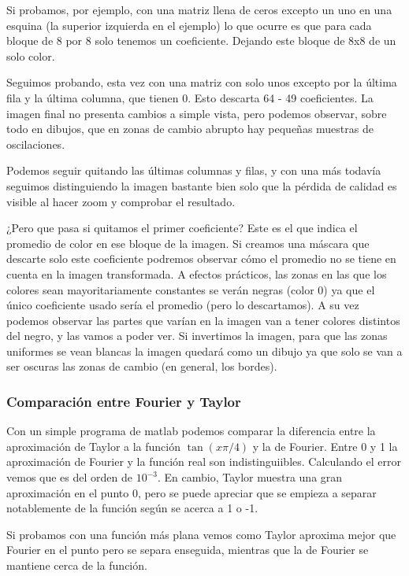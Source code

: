 		Si probamos, por ejemplo, con una matriz llena de ceros excepto un uno en una esquina (la superior izquierda en el ejemplo) lo que ocurre es que para cada bloque de 8 por 8 solo tenemos un coeficiente. Dejando este bloque de 8x8 de un solo color.

		Seguimos probando, esta vez con una matriz con solo unos excepto por la última fila y la última columna, que tienen 0. Esto descarta 64 - 49 coeficientes. La imagen final no presenta cambios a simple vista, pero podemos observar, sobre todo en dibujos, que en zonas de cambio abrupto hay pequeñas muestras de oscilaciones.


		Podemos seguir quitando las últimas columnas y filas, y con una más todavía seguimos distinguiendo la imagen bastante bien solo que la pérdida de calidad es visible al hacer zoom y comprobar el resultado.

		¿Pero que pasa si quitamos el primer coeficiente? Este es el que indica el promedio de color en ese bloque de la imagen. Si creamos una máscara que descarte solo este coeficiente podremos observar cómo el promedio no se tiene en cuenta en la imagen transformada. A efectos prácticos, las zonas en las que los colores sean mayoritariamente constantes se verán negras (color 0) ya que el único coeficiente usado sería el promedio (pero lo descartamos). A su vez podemos observar las partes que varían en la imagen van a tener colores distintos del negro, y las vamos a poder ver. Si invertimos la imagen, para que las zonas uniformes se vean blancas la imagen quedará como un dibujo ya que solo se van a ser oscuras las zonas de cambio (en general, los bordes).

	\subsubsection{Comparación entre Fourier y Taylor}

		Con un simple programa de matlab podemos comparar la diferencia entre la aproximación de Taylor a la función $\tan(x \pi/4)$ y la de Fourier. Entre 0 y 1 la aproximación de Fourier y la función real son indistinguiibles. Calculando el error vemos que es del orden de $10^{-3}$. En cambio, Taylor muestra una gran aproximación en el punto 0, pero se puede apreciar que se empieza a separar notablemente de la función según se acerca a 1 o -1.

		Si probamos con una función más plana vemos como Taylor aproxima mejor que Fourier en el punto pero se separa enseguida, mientras que la de Fourier se mantiene cerca de la función.


